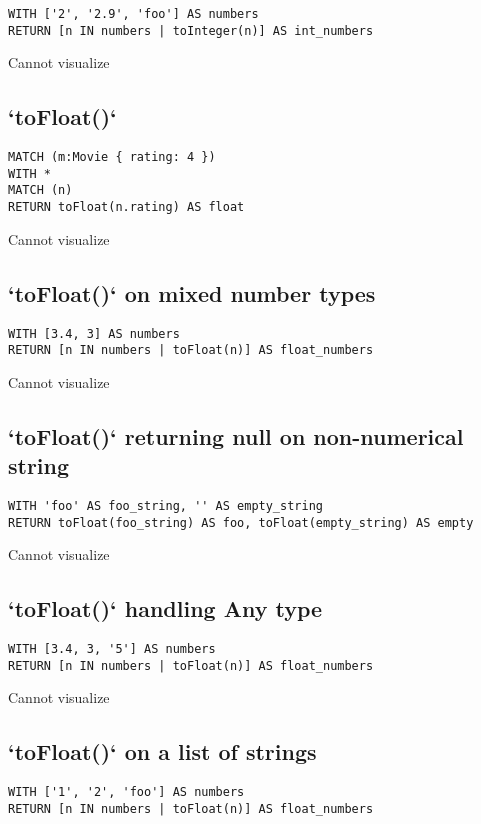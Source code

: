 \begin{lstlisting}
WITH ['2', '2.9', 'foo'] AS numbers
RETURN [n IN numbers | toInteger(n)] AS int_numbers
\end{lstlisting}

Cannot visualize
\subsection{`toFloat()`}

\begin{lstlisting}
MATCH (m:Movie { rating: 4 })
WITH *
MATCH (n)
RETURN toFloat(n.rating) AS float
\end{lstlisting}

Cannot visualize
\subsection{`toFloat()` on mixed number types}

\begin{lstlisting}
WITH [3.4, 3] AS numbers
RETURN [n IN numbers | toFloat(n)] AS float_numbers
\end{lstlisting}

Cannot visualize
\subsection{`toFloat()` returning null on non-numerical string}

\begin{lstlisting}
WITH 'foo' AS foo_string, '' AS empty_string
RETURN toFloat(foo_string) AS foo, toFloat(empty_string) AS empty
\end{lstlisting}

Cannot visualize
\subsection{`toFloat()` handling Any type}

\begin{lstlisting}
WITH [3.4, 3, '5'] AS numbers
RETURN [n IN numbers | toFloat(n)] AS float_numbers
\end{lstlisting}

Cannot visualize
\subsection{`toFloat()` on a list of strings}

\begin{lstlisting}
WITH ['1', '2', 'foo'] AS numbers
RETURN [n IN numbers | toFloat(n)] AS float_numbers
\end{lstlisting}


